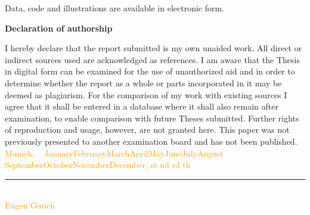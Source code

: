 \documentclass[12pt]{article}
\newcommand{\myname}{\large Eugen Gorich}
\newcommand{\thesuffix}[1]{%
  \ifnum#1=1 st%
  \else\ifnum#1=2 nd%
  \else\ifnum#1=3 rd%
  \else th%
  \fi\fi\fi}
\newcommand{\mydate}{%
  ~\ifcase\month\or
  January\or February\or March\or April\or May\or June\or July\or August\or
  September\or October\or November\or December\fi, \the\day\thesuffix{\day} \number\year}
\begin{document}
Data, code and illustrations are available in electronic form. \bigskip


\newpage


\RaggedRight


\newpage
\Large
\noindent
\textbf{Declaration of authorship} 
\vspace{0.5cm}
\noindent
\normalsize

I hereby declare that the report submitted is my own unaided work. All direct 
or indirect sources used are acknowledged as references. I am aware that the 
Thesis in digital form can be examined for the use of unauthorized aid and in 
order to determine whether the report as a whole or parts incorporated in it may 
be deemed as plagiarism. For the comparison of my work with existing sources I 
agree that it shall be entered in a database where it shall also remain after 
examination, to enable comparison with future Theses submitted. Further rights 
of reproduction and usage, however, are not granted here. This paper was not 
previously presented to another examination board and has not been published.
\\

\vspace{1cm}
\textcolor{orange}{Munich, \mydate} \\

\vspace{3cm}

\noindent\rule{0.5\textwidth}{0.4pt} \\

\textcolor{orange}{\myname}
\end{document}
